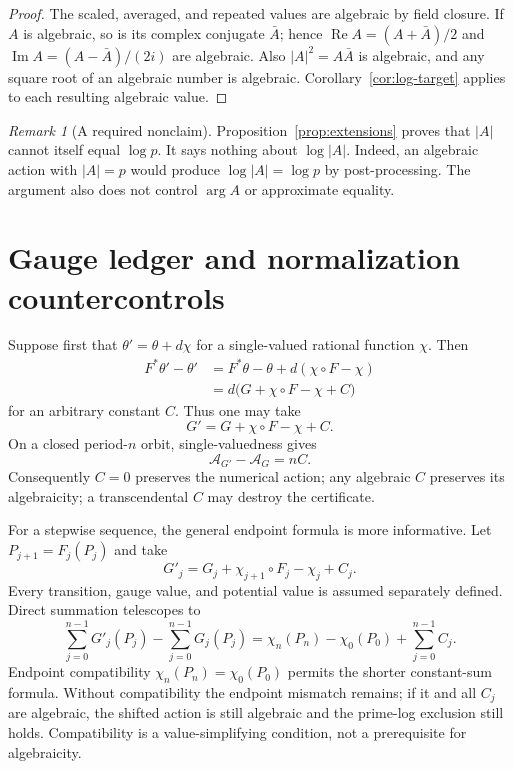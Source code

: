 \documentclass[11pt]{article}
\theoremstyle{definition}
\theoremstyle{remark}
\newtheorem{remark}[theorem]{Remark}
\newcommand{\Action}{\mathcal A}
\begin{document}
\begin{proof}
The scaled, averaged, and repeated values are algebraic by field closure.  If
$A$ is algebraic, so is its complex conjugate $\bar A$; hence
$\operatorname{Re}A=(A+\bar A)/2$ and
$\operatorname{Im}A=(A-\bar A)/(2i)$ are algebraic.  Also
$|A|^2=A\bar A$ is algebraic, and any square root of an algebraic number is
algebraic.  Corollary~\ref{cor:log-target} applies to each resulting
algebraic value.
\end{proof}

\begin{remark}[A required nonclaim]
Proposition~\ref{prop:extensions} proves that $|A|$ cannot itself equal
$\log p$.  It says nothing about $\log|A|$.  Indeed, an algebraic action with
$|A|=p$ would produce $\log|A|=\log p$ by post-processing.  The argument also
does not control $\arg A$ or approximate equality.
\end{remark}

\section{Gauge ledger and normalization countercontrols}
\label{sec:gauge}

Suppose first that $\theta'=\theta+d\chi$ for a single-valued rational
function $\chi$.  Then
\begin{align}
F^*\theta'-\theta'
 &=F^*\theta-\theta+d(\chi\circ F-\chi) \\
 &=d\bigl(G+\chi\circ F-\chi+C\bigr)
\end{align}
for an arbitrary constant $C$.  Thus one may take
\begin{equation}
  G'=G+\chi\circ F-\chi+C.
  \label{eq:autonomous-gauge}
\end{equation}
On a closed period-$n$ orbit, single-valuedness gives
\begin{equation}
  \Action_{G'}-\Action_G=nC.
  \label{eq:autonomous-shift}
\end{equation}
Consequently $C=0$ preserves the numerical action; any algebraic $C$
preserves its algebraicity; a transcendental $C$ may destroy the certificate.

For a stepwise sequence, the general endpoint formula is more informative.
Let $P_{j+1}=F_j(P_j)$ and take
\begin{equation}
 G'_j=G_j+\chi_{j+1}\circ F_j-\chi_j+C_j.
 \label{eq:step-gauge}
\end{equation}
Every transition, gauge value, and potential value is assumed separately
defined.  Direct summation telescopes to
\begin{equation}
 \sum_{j=0}^{n-1}G'_j(P_j)-\sum_{j=0}^{n-1}G_j(P_j)
 =\chi_n(P_n)-\chi_0(P_0)+\sum_{j=0}^{n-1}C_j.
 \label{eq:general-endpoint}
\end{equation}
Endpoint compatibility $\chi_n(P_n)=\chi_0(P_0)$ permits the shorter
constant-sum formula.  Without compatibility the endpoint mismatch remains;
if it and all $C_j$ are algebraic, the shifted action is still algebraic and
the prime-log exclusion still holds.  Compatibility is a value-simplifying
condition, not a prerequisite for algebraicity.
\end{document}
